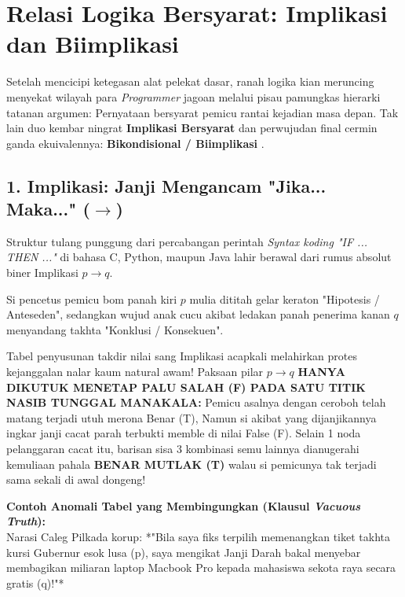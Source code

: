 \section{Relasi Logika Bersyarat: Implikasi dan Biimplikasi}

Setelah mencicipi ketegasan alat pelekat dasar, ranah logika kian meruncing menyekat wilayah para \textit{Programmer} jagoan melalui pisau pamungkas hierarki tatanan argumen: Pernyataan bersyarat pemicu rantai kejadian masa depan. Tak lain duo kembar ningrat \textbf{Implikasi Bersyarat} dan perwujudan final cermin ganda ekuivalennya: \textbf{Bikondisional / Biimplikasi} \cite{rosen2019}.

\subsection{1. Implikasi: Janji Mengancam "Jika... Maka..." ($\rightarrow$)}

Struktur tulang punggung dari percabangan perintah \textit{Syntax koding "IF ... THEN ..."} di bahasa C, Python, maupun Java lahir berawal dari rumus absolut biner Implikasi $p \rightarrow q$.

Si pencetus pemicu bom panah kiri $p$ mulia dititah gelar keraton "Hipotesis / Anteseden", sedangkan wujud anak cucu akibat ledakan panah penerima kanan $q$ menyandang takhta "Konklusi / Konsekuen".

\begin{definisi}
Tabel penyusunan takdir nilai sang Implikasi acapkali melahirkan protes kejanggalan nalar kaum natural awam! Paksaan pilar $p \rightarrow q$ \textbf{HANYA DIKUTUK MENETAP PALU SALAH (F) PADA SATU TITIK NASIB TUNGGAL MANAKALA:} Pemicu asalnya dengan ceroboh telah matang terjadi utuh merona Benar (T), Namun si akibat yang dijanjikannya ingkar janji cacat parah terbukti memble di nilai False (F). Selain 1 noda pelanggaran cacat itu, barisan sisa 3 kombinasi semu lainnya dianugerahi kemuliaan pahala \textbf{BENAR MUTLAK (T)} walau si pemicunya tak terjadi sama sekali di awal dongeng!
\end{definisi}

\textbf{Contoh Anomali Tabel yang Membingungkan (Klausul \textit{Vacuous Truth}):} \\
Narasi Caleg Pilkada korup: *"Bila saya fiks terpilih memenangkan tiket takhta kursi Gubernur esok lusa (p), saya mengikat Janji Darah bakal menyebar membagikan miliaran laptop Macbook Pro kepada mahasiswa sekota raya secara gratis (q)!"*

